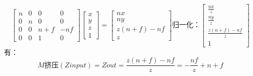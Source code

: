 $$
\begin{bmatrix}
  n & 0 & 0 & 0 \\
  0 & n & 0 & 0 \\
  0 & 0 & n + f & -nf \\
  0 & 0 & 1 & 0
\end{bmatrix}
\begin{bmatrix}
  x \\
  y \\
  z \\
  1
\end{bmatrix}
=
\begin{bmatrix}
  nx \\
  ny \\
  z(n+f) -nf \\
  z
\end{bmatrix}
归一化：
\begin{bmatrix}
  \frac{nx}{z} \\
  \frac{ny}{z} \\
  \frac{z(n+f) - nf}{z} \\
  1
\end{bmatrix}
$$
有：
$$
M挤压(Zinput)=Zout=
\frac{z(n+f) - nf}{z}=
-\frac{nf}{z} + n + f
$$